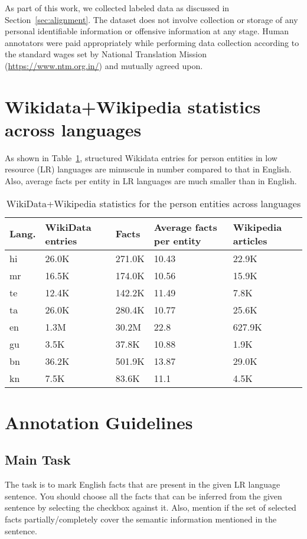 \documentclass[11pt]{article}
\begin{document}
As part of this work, we collected labeled data as discussed in Section~\ref{sec:alignment}. The dataset does not involve collection or storage of any personal identifiable information or offensive information at any stage. Human annotators were paid appropriately while performing data collection according to the standard wages set by National Translation Mission (\url{https://www.ntm.org.in/}) and mutually agreed upon.

\section{Wikidata+Wikipedia statistics across languages}
As shown in Table~\ref{tab:wikiDataWikipediaStats}, structured Wikidata entries for person entities in low resource (LR) languages are minuscule in number compared to that in English. Also, average facts per entity in LR languages are much smaller than in English.
\begin{table}[!b]
    \centering
    \scriptsize
    \begin{tabular}{|p{0.3in}|p{0.5in}|p{0.3in}|p{0.7in}|p{0.5in}|}
\hline
Lang.&WikiData entries&Facts&Average facts per entity&Wikipedia articles\\
\hline
\hline
hi&26.0K&271.0K&10.43&22.9K\\
\hline
mr&16.5K&174.0K&10.56&15.9K\\
\hline
te&12.4K&142.2K&11.49&7.8K\\
\hline
ta&26.0K&280.4K&10.77&25.6K\\
\hline
en&1.3M&30.2M&22.8&627.9K\\
\hline
gu&3.5K&37.8K&10.88&1.9K\\
\hline
bn&36.2K&501.9K&13.87&29.0K\\
\hline
kn&7.5K&83.6K&11.1&4.5K\\
\hline
    \end{tabular}
    \caption{WikiData+Wikipedia statistics for the person entities across languages}
    \label{tab:wikiDataWikipediaStats}
\end{table}

\section{Annotation Guidelines}
\subsection{Main Task}
The task is to mark English facts that are present in the given LR language sentence. You should choose all the facts that can be inferred from the given sentence by selecting the checkbox against it. Also, mention if the set of selected facts partially/completely cover the semantic information mentioned in the sentence.
\end{document}
